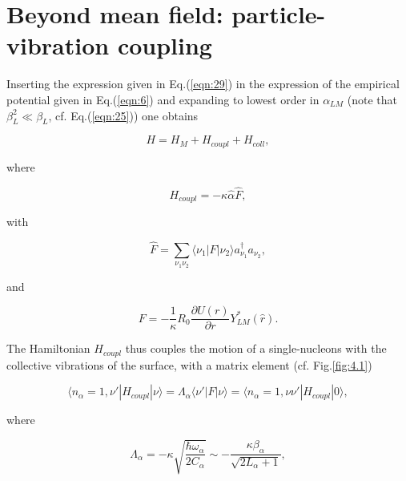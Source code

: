 \documentclass[a4paper,14pt]{book}
\begin{document}
 \setcounter{chapter}{3}



\chapter{Beyond mean field: particle-vibration coupling}

Inserting the expression given in Eq.(\ref{eqn:29}) in the expression of the empirical potential given in Eq.(\ref{eqn:6}) and expanding to lowest order in $\alpha_{LM}$ (note that $\beta_L^2 \ll \beta_L$, cf. Eq.(\ref{eqn:25})) one obtains

\begin{equation}
H = H_M + H_{coupl} + H_{coll} ,
\label{eqn:30}
\end{equation}

\noindent where

\begin{equation}
H_{coupl} = -\kappa \hat{\alpha} \hat{F} ,
\label{eqn:31}
\end{equation}

\noindent with

\begin{equation}
\hat{F} = \sum_{\nu_1 \nu_2} \langle \nu_1|F|\nu_2 \rangle a_{\nu_1}^{\dagger} a_{\nu_2} ,
\label{eqn:32}
\end{equation}

\noindent and

\begin{equation}
F = - \frac{1}{\kappa} R_0 \frac{\partial U(r)}{\partial r} Y_{LM}^* (\hat{r}) .
\label{eqn:33}
\end{equation}

\noindent The Hamiltonian $H_{coupl}$ thus couples the motion of a single-nucleons with the collective vibrations of the surface, with a matrix element (cf. Fig.\ref{fig:4.1})

\begin{equation}
\langle n_{\alpha} = 1, \nu' |H_{coupl}|\nu \rangle = \Lambda_{\alpha} \langle \nu' |F|\nu \rangle = \langle n_{\alpha}=1, \nu\nu'|H_{coupl}|0 \rangle ,
\label{eqn:34}
\end{equation}

\noindent where

\begin{equation}
\Lambda_{\alpha} = -\kappa \sqrt{\frac{\hbar\omega_{\alpha}}{2C_{\alpha}}} \sim -\frac{\kappa \beta_{\alpha}}{\sqrt{2L_{\alpha}+1}} ,
\label{eqn:35}
\end{equation}
\end{document}
